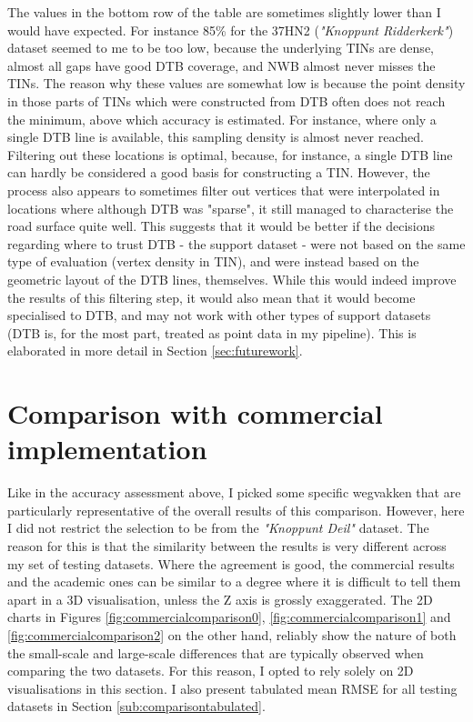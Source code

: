 The values in the bottom row of the table are sometimes slightly lower than I would have expected. For instance 85\% for the 37HN2 (\textit{"Knoppunt Ridderkerk"}) dataset seemed to me to be too low, because the underlying TINs are dense, almost all gaps have good DTB coverage, and NWB almost never misses the TINs. The reason why these values are somewhat low is because the point density in those parts of TINs which were constructed from DTB often does not reach the minimum, above which accuracy is estimated. For instance, where only a single DTB line is available, this sampling density is almost never reached. Filtering out these locations is optimal, because, for instance, a single DTB line can hardly be considered a good basis for constructing a TIN. However, the process also appears to sometimes filter out vertices that were interpolated in locations where although DTB was "sparse", it still managed to characterise the road surface quite well. This suggests that it would be better if the decisions regarding where to trust DTB - the support dataset - were not based on the same type of evaluation (vertex density in TIN), and were instead based on the geometric layout of the DTB lines, themselves. While this would indeed improve the results of this filtering step, it would also mean that it would become specialised to DTB, and may not work with other types of support datasets (DTB is, for the most part, treated as point data in my pipeline). This is elaborated in more detail in Section \ref{sec:futurework}.

\section{Comparison with commercial implementation}
\label{sec:comparison}

Like in the accuracy assessment above, I picked some specific wegvakken that are particularly representative of the overall results of this comparison. However, here I did not restrict the selection to be from the \textit{"Knoppunt Deil"} dataset. The reason for this is that the similarity between the results is very different across my set of testing datasets. Where the agreement is good, the commercial results and the academic ones can be similar to a degree where it is difficult to tell them apart in a 3D visualisation, unless the Z axis is grossly exaggerated. The 2D charts in Figures \ref{fig:commercialcomparison0}, \ref{fig:commercialcomparison1} and \ref{fig:commercialcomparison2} on the other hand, reliably show the nature of both the small-scale and large-scale differences that are typically observed when comparing the two datasets. For this reason, I opted to rely solely on 2D visualisations in this section. I also present tabulated mean RMSE for all testing datasets in Section \ref{sub:comparisontabulated}.

